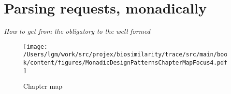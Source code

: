 

\chapter{Parsing requests, monadically}
\begin{center}
{\small\em How to get from the obligatory to the well formed}
\end{center}

\begin{figure}[tbp]
\begin{center}
{ \texttt{[image: /Users/lgm/work/src/projex/biosimilarity/trace/src/main/book/content/figures/MonadicDesignPatternsChapterMapFocus4.pdf]} }
\caption{ Chapter map }
\end{center}
\end{figure}











